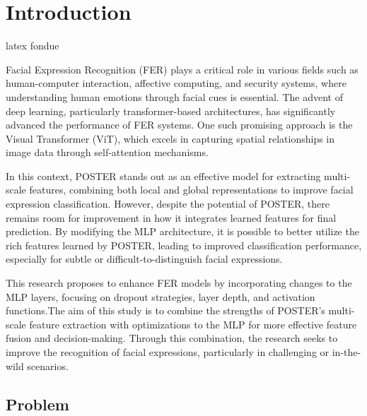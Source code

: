 \chapter{Introduction}
\label{chapter:introduction}
%
%
\Gls{latex}
\Gls{fondue}

Facial Expression Recognition (FER) plays a critical role in various fields such as human-computer interaction, affective computing, and security systems, where understanding human emotions through facial cues is essential. The advent of deep learning, particularly transformer-based architectures, has significantly advanced the performance of FER systems. One such promising approach is the Visual Transformer (ViT), which excels in capturing spatial relationships in image data through self-attention mechanisms.

In this context, POSTER \cite{zheng_poster_2022} stands out as an effective model for extracting multi-scale features, combining both local and global representations to improve facial expression classification. However, despite the potential of POSTER, there remains room for improvement in how it integrates learned features for final prediction. By modifying the MLP architecture, it is possible to better utilize the rich features learned by POSTER, leading to improved classification performance, especially for subtle or difficult-to-distinguish facial expressions. 


This research proposes to enhance FER models by incorporating changes to the MLP layers, focusing on dropout strategies, layer depth, and activation functions.The aim of this study is to combine the strengths of POSTER’s multi-scale feature extraction with optimizations to the MLP for more effective feature fusion and decision-making. Through this combination, the research seeks to improve the recognition of facial expressions, particularly in challenging or \gls{in-the-wild} scenarios. 

\newpage

\section{Problem}


%

